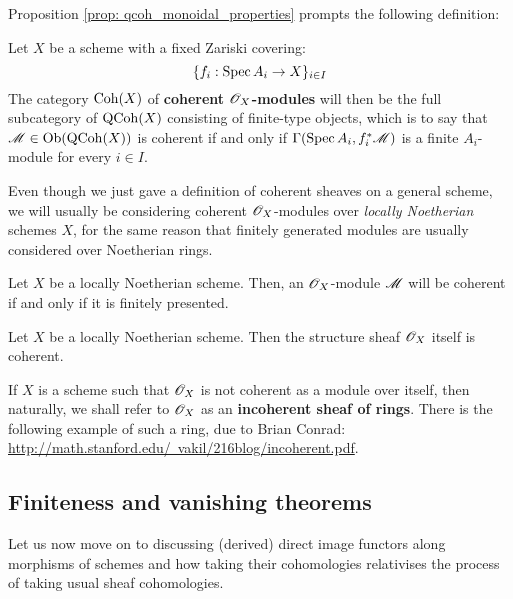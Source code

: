             Proposition \ref{prop: qcoh_monoidal_properties} prompts the following definition:
            \begin{definition} \label{def: coherent_modules}
                Let $X$ be a scheme with a fixed Zariski covering:
                    $$\{ f_i: \operatorname{Spec} A_i \to X \}_{i \in I}$$
                The category $\mathrm{Coh}(X)$ of \textbf{coherent $\mathscr{O}_X$-modules} will then be the full subcategory of $\mathrm{QCoh}(X)$ consisting of finite-type objects, which is to say that $\mathscr{M} \in \mathrm{Ob}( \mathrm{QCoh}(X) )$ is coherent if and only if $\Gamma(\operatorname{Spec} A_i, f_i^*\mathscr{M})$ is a finite $A_i$-module for every $i \in I$.
            \end{definition}
            Even though we just gave a definition of coherent sheaves on a general scheme, we will usually be considering coherent $\mathscr{O}_X$-modules over \textit{locally Noetherian} schemes $X$, for the same reason that finitely generated modules are usually considered over Noetherian rings. 
            \begin{proposition} \label{prop: coherent_modules_over_noetherian_schemes}
                Let $X$ be a locally Noetherian scheme. Then, an $\mathscr{O}_X$-module $\mathscr{M}$ will be coherent if and only if it is finitely presented.
            \end{proposition}
            \begin{example}
                Let $X$ be a locally Noetherian scheme. Then the structure sheaf $\mathscr{O}_X$ itself is coherent. 
            \end{example}
            \begin{example}
                If $X$ is a scheme such that $\mathscr{O}_X$ is not coherent as a module over itself, then naturally, we shall refer to $\mathscr{O}_X$ as an \textbf{incoherent sheaf of rings}. There is the following example of such a ring, due to Brian Conrad: \href{http://math.stanford.edu/~vakil/216blog/incoherent.pdf}{http://math.stanford.edu/~vakil/216blog/incoherent.pdf}.
            \end{example}

        \subsection{Finiteness and vanishing theorems}
            Let us now move on to discussing (derived) direct image functors along morphisms of schemes and how taking their cohomologies relativises the process of taking usual sheaf cohomologies.

